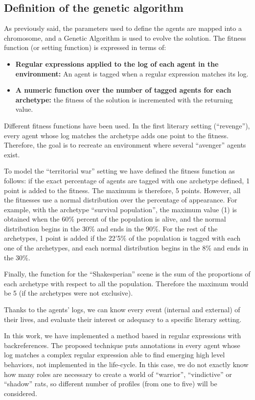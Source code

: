 \documentclass[letterpaper]{article}
\begin{document}
\subsection{Definition of  the genetic algorithm}

As previously said, the parameters used to define the agents are mapped into a chromosome, and a Genetic Algorithm is used to evolve the solution. The fitness function (or setting function) is expressed in terms of:

\begin{itemize}
\item \textbf{Regular expressions applied to the log of each agent in the environment:} An agent is tagged when a regular expression matches its log.
\item \textbf{A numeric function over the number of tagged agents for each archetype:} the fitness of the solution is incremented with the returning value.
\end{itemize}

Different fitness functions have been used. In the first literary setting (``revenge''), every agent whose log matches the archetype adds one point to the fitness. Therefore, the goal is to recreate an environment where several ``avenger'' agents exist.

To model the ``territorial war'' setting we have defined the fitness function as follows: if the exact percentage of agents are tagged with one archetype defined, 1 point is added to the fitness. The maximum is therefore, 5 points. However, all the fitnesses use a normal distribution over the percentage of appearance. For example, with the archetype ``survival population'', the maximum value (1) is obtained when the 60\% percent of the population is alive, and the normal distribution begins in the 30\% and ends in the 90\%. For the rest of the archetypes, 1 point is added if the 22'5\% of the population is tagged with each one of the archetypes, and each normal distribution begins in the 8\% and ends in the 30\%.

Finally, the function for the ``Shakesperian'' scene is the sum of the proportions of each archetype with respect to all the population. Therefore the maximum would be 5 (if the archetypes were not exclusive). 


Thanks to the agents' logs, we can know every event (internal and
external) of their lives, and evaluate their interest or
adequacy to a specific literary setting.

In this work, we have implemented a method based in regular expressions with backreferences. The proposed technique puts annotations in every agent whose log matches a complex regular expression able to find emerging high level behaviors, not implemented in the life-cycle. In this case,
 we do not exactly know how many roles are necessary to create a world of ``warrior'', ``vindictive'' or ``shadow''
  rats, so different number of profiles (from one to five) will be considered.
\end{document}
